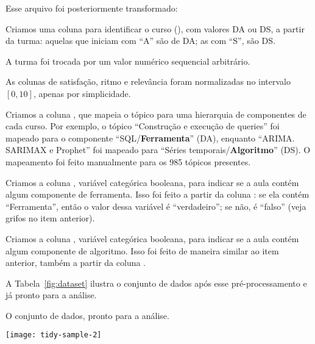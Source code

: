 Esse arquivo foi posteriormente transformado:
\begin{compactitem}
	\item Criamos uma coluna para identificar o curso (), com valores DA ou DS, a partir da turma: aquelas que iniciam com ``A'' são de DA; as com ``S'', são DS.
	
	\item A turma foi trocada por um valor numérico sequencial arbitrário.
	
	\item As colunas de satisfação, ritmo e relevância foram normalizadas no intervalo $[0,10]$, apenas por simplicidade.

	\item Criamos a coluna , que mapeia o tópico para uma hierarquia  de componentes de cada curso.
	Por exemplo, o tópico ``Construção e execução de queries'' foi mapeado para o componente ``SQL/\textbf{Ferramenta}'' (DA), enquanto ``ARIMA. SARIMAX e Prophet'' foi mapeado para ``Séries temporais/\textbf{Algoritmo}'' (DS).
	O mapeamento foi feito manualmente para os 985 tópicos presentes.

	\item Criamos a coluna , variável categórica booleana, para indicar se a aula contém algum componente de ferramenta.
	Isso foi feito a partir da coluna : se ela contém ``Ferramenta'', então o valor dessa variável é ``verdadeiro''; se não, é ``falso'' (veja grifos no item anterior).
	
	\item Criamos a coluna , variável categórica booleana, para indicar se a aula contém algum componente de algoritmo.
	Isso foi feito de maneira similar ao item anterior, também a partir da coluna .
\end{compactitem}

A Tabela~\ref{fig:dataset} ilustra o conjunto de dados após esse pré-processamento e já pronto para a análise.

\begin{table}
	\centering
	\caption{O conjunto de dados, pronto para a análise.}
	\texttt{[image: tidy-sample-2]}
	\label{fig:dataset}
\end{table}